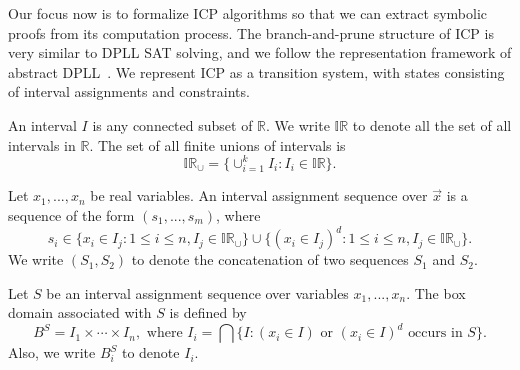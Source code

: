 \documentclass[envcountsect]{llncs}
\begin{document}
Our focus now is to formalize ICP algorithms so that we can extract symbolic proofs from
its computation process. The branch-and-prune structure of ICP is very similar
to DPLL SAT solving, and we follow the representation framework of abstract
DPLL~\cite{}. We represent ICP as a transition system, with states consisting of
interval assignments and constraints.  
\begin{definition}[Intervals]
An interval $I$ is any connected subset of $\mathbb{R}$. We write $\mathbb{IR}$
to denote all the set of all intervals in $\mathbb{R}$. The set of all finite
unions of intervals is
$$\mathbb{IR}_{\cup} = \{\cup_{i=1}^k I_i: I_i\in\mathbb{IR}\}.$$
\end{definition}
\begin{definition}
Let $x_1,...,x_n$ be real variables. An interval assignment sequence over
$\vec x$ is a sequence of the form $(s_1,...,s_m)$, where 
$$s_i\in \{x_i\in I_j: 1\leq i\leq n, I_j\in
\mathbb{IR}_{\cup}\}\cup\{(x_i\in I_j)^d: 1\leq i\leq n, I_j\in
\mathbb{IR}_{\cup}\}.
$$
We write $(S_1, S_2)$ to denote the concatenation of two sequences $S_1$ and
$S_2$. 
\end{definition}
\begin{definition}
Let $S$ be an interval assignment sequence over variables $x_1,...,x_n$. The box
domain associated with $S$ is defined by 
$$B^S = I_1\times\cdots \times I_n, \mbox{ where }I_i = \bigcap\{ I: (x_i\in
I)\mbox{ or } (x_i\in I)^d \mbox{ occurs in } S\}.$$ 
Also, we write $B^S_i$ to denote $I_i$. 
\end{definition}
\end{document}
